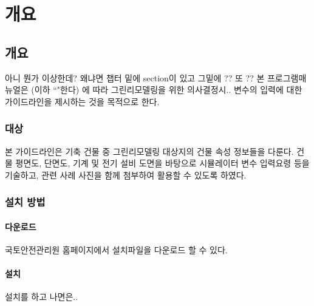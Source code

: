 \part{개요}
\label{part:introduction}


\chapter{개요}
아니 뭔가 이상한데? 왜냐면
챕터 밑에 section이 있고 그밑에 ?? 또 ?? 
본 프로그램매뉴얼은 \fullnamepolicy (이하 ``\policy"\라 한다) 에 따라 그린리모델링을 위한 의사결정시.. 변수의 입력에 대한 가이드라인을 제시하는 것을 목적으로 한다.

\section{대상}
본 가이드라인은 기축 건물 중 그린리모델링 대상지의 건물 속성 정보들을 다룬다. 건물 평면도, 단면도, 기계 및 전기 설비 도면을 바탕으로 시뮬레이터 변수 입력요령 등을 기술하고, 관련 사례 사진을 함께 첨부하여 활용할 수 있도록 하였다.


\section{설치 방법}
\subsection{다운로드}
\simulator\는 국토안전관리원 홈페이지에서 설치파일을 다운로드 할 수 있다.

\subsection{설치}
설치를 하고 나면은..


